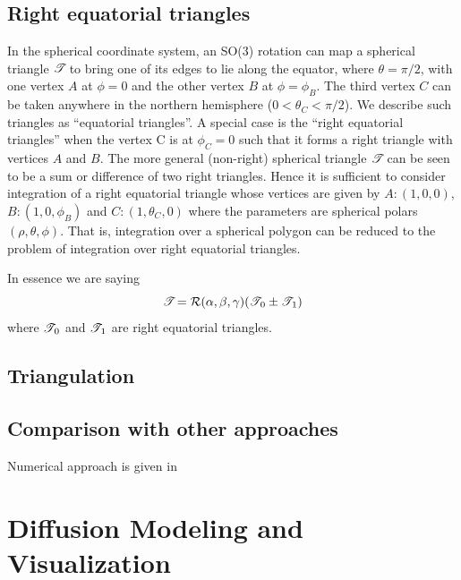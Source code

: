 \documentclass[10pt, twocolumn, twoside]{IEEEtran}
\begin{document}
\begin{bibunit}
\subsection{Right equatorial triangles}

In the spherical coordinate system, an SO(3) rotation can map a spherical triangle $\mathscr{T}\!$ to bring one of its edges to lie along the equator, where $\theta=\pi/2$, with one vertex $A$ at $\phi=0$ and the other vertex $B$ at $\phi=\phi_B$.  The third vertex $C$ can be taken anywhere in the northern hemisphere ($0<\theta_C<\pi/2$).  We describe such triangles as ``equatorial triangles''.  A special case is the ``right equatorial triangles'' when the vertex C is at $\phi_C=0$ such that it forms a right triangle with vertices $A$ and $B$.  The more general (non-right) spherical triangle $\mathscr{T}\!$ can be seen to be a sum or difference of two right triangles.  Hence it is sufficient to consider integration of a right equatorial triangle whose vertices are given by $A\colon(1,0,0)$, $B\colon(1,0,\phi_B)$ and $C\colon(1,\theta_C,0)$ where the parameters are spherical polars $(\rho,\theta,\phi)$.  That is, integration over a spherical polygon can be reduced to the problem of integration over right equatorial triangles.

In essence we are saying 
\[
	\mathscr{T}\! = \mathcal{R}(\alpha,\beta,\gamma)(\mathscr{T}\!_0\pm\mathscr{T}\!_1)
\]
where $\mathscr{T}\!_0$ and $\mathscr{T}\!_1$ are right equatorial triangles.

\subsection{Triangulation}




\subsection{Comparison with other approaches}

Numerical approach is given in \cite{Sanchez:2004}

\putbib
\end{bibunit}

\clearpage

\section{Diffusion Modeling and Visualization}

\newcommand{\newurl}[1]{{\small\color{blue!80!black}\ttfamily\bfseries\url{#1}}}
\end{document}
